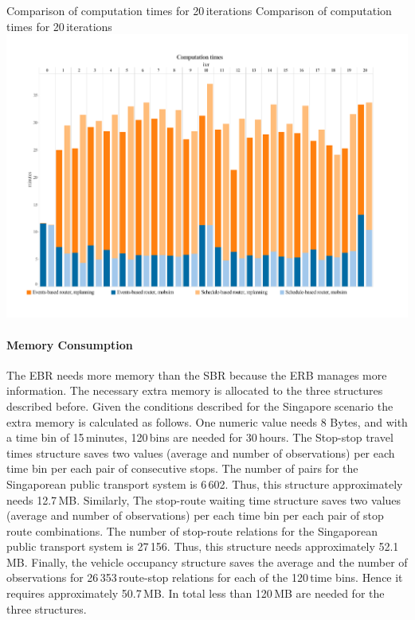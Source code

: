 \createfigure
{Comparison of computation times for 20\,iterations}
{Comparison of computation times for 20\,iterations}
{\label{fig:CompTimes}}
{\includegraphics[width=1.0\textwidth]{extending/figures/ebr/ComputationTimes.pdf}}
{}

\paragraph{Memory Consumption}

The EBR needs more memory than the SBR because the ERB manages more information. The necessary extra memory is allocated to the three structures described before. Given the conditions described for the Singapore scenario the extra memory is calculated as follows. One numeric value needs 8 Bytes, and with a time bin of 15\,minutes, 120\,bins are needed for 30\,hours. The Stop-stop travel times structure saves two values (average and number of observations) per each time bin per each pair of consecutive stops. The number of pairs for the Singaporean public transport system is 6\,602. Thus, this structure approximately needs 12.7\,MB. Similarly, The stop-route waiting time structure saves two values (average and number of observations) per each time bin per each pair of stop route combinations. The number of stop-route relations for the Singaporean public transport system is 27\,156. Thus, this structure needs approximately 52.1\,MB. Finally, the vehicle occupancy structure saves the average and the number of observations for 26\,353\,route-stop relations for each of the 120\,time bins. Hence it requires approximately 50.7\,MB. In total less than 120\,MB are needed for the three structures.

